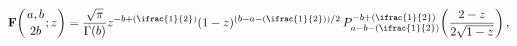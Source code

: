\[\mathop{\mathbf{F}\/}\nolimits\!\left({a,b\atop 2b};z\right)=\frac{\sqrt{\pi}}%
{\mathop{\Gamma\/}\nolimits\!\left(b\right)}z^{-b+(\ifrac{1}{2})}(1-z)^{(b-a-(%
\ifrac{1}{2}))/2}\*\mathop{P^{-b+(\ifrac{1}{2})}_{a-b-(\ifrac{1}{2})}\/}%
\nolimits\!\left(\frac{2-z}{2\sqrt{1-z}}\right),\]